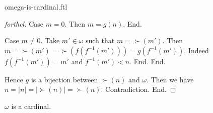 \documentclass{naproche-library}
\begin{document}
\begin{smodule}{omega-is-cardinal.ftl}
\begin{proof}[forthel]
        Case $m = 0$.
          Then $m = g(n)$.
        End.

        Case $m \neq 0$.
          Take $m' \in \omega$ such that $m = \succ(m')$.
          Then $m
            = \succ(m')
            = \succ(f(f^{-1}(m')))
            = g(f^{-1}(m'))$.
          Indeed $f(f^{-1}(m')) = m'$ and $f^{-1}(m') < n$.
        End.
      End.

      Hence $g$ is a bijection between $\succ(n)$ and $\omega$.
      Then we have $n
        = |n|
        = |\succ(n)|
        = \succ(n)$.
      Contradiction.
    End.
  \end{proof}

  \begin{corollary}[forthel,id=SET_THEORY_07_2717623053713408,printid]
    $\omega$ is a cardinal.
  \end{corollary}
\end{smodule}
\end{document}
